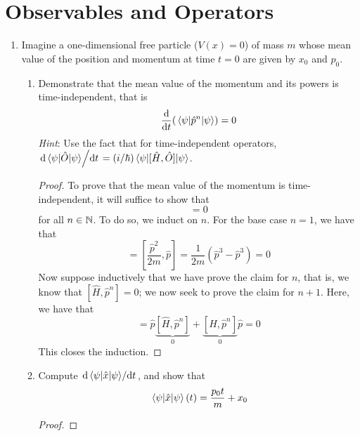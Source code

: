 \documentclass[../psets.tex]{subfiles}
\begin{document}
\section{Observables and Operators}
\begin{enumerate}
    \item {}Imagine a one-dimensional free particle ($V(x)=0$) of mass $m$ whose mean value of the position and momentum at time $t=0$ are given by $x_0$ and $p_0$.
    \begin{enumerate}
        \item Demonstrate that the mean value of the momentum and its powers is time-independent, that is
        \begin{equation}
            \dv{t}(\ev{\hat{p}^n}{\psi}) = 0
        \end{equation}
        \emph{Hint}: Use the fact that for time-independent operators, $\dv*{\ev{\hat{O}}{\psi}}{t}=(i/\hbar)\ev{[\hat{H},\hat{O}]}{\psi}$.
        \begin{proof}
            To prove that the mean value of the momentum is time-independent, it will suffice to show that
            \begin{equation*}
                [\hat{H},\hat{p}^n] = 0
            \end{equation*}
            for all $n\in\mathbb{N}$. To do so, we induct on $n$. For the base case $n=1$, we have that
            \begin{equation*}
                [\hat{H},\hat{p}] = \left[ \frac{\hat{p}^2}{2m},\hat{p} \right]
                = \frac{1}{2m}(\hat{p}^3-\hat{p}^3)
                = 0
            \end{equation*}
            Now suppose inductively that we have prove the claim for $n$, that is, we know that $[\hat{H},\hat{p}^n]=0$; we now seek to prove the claim for $n+1$. Here, we have that
            \begin{equation*}
                [\hat{H},\hat{p}^{n+1}] = \hat{p}\underbrace{[\hat{H},\hat{p}^n]}_0+\underbrace{[\hat{H},\hat{p}^n]}_0\hat{p}
                = 0
            \end{equation*}
            This closes the induction.
        \end{proof}
        \item Compute $\dv*{\ev{\hat{x}}{\psi}}{t}$, and show that
        \begin{equation}
            \ev{\hat{x}}{\psi}(t) = \frac{p_0t}{m}+x_0
        \end{equation}
        \begin{proof}

\end{proof}
\end{enumerate}
\end{enumerate}
\end{document}
